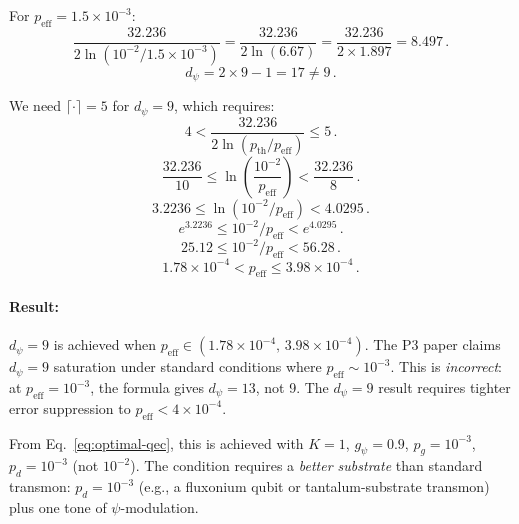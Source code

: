 \documentclass[11pt]{article}
\theoremstyle{definition}
\theoremstyle{remark}
\begin{document}
For $p_{\mathrm{eff}} = 1.5 \times 10^{-3}$:
\begin{equation}
\frac{32.236}{2\ln(10^{-2}/1.5\times 10^{-3})}
= \frac{32.236}{2\ln(6.67)} = \frac{32.236}{2 \times 1.897} = 8.497\,.
\end{equation}
\begin{equation}
d_\psi = 2\times 9 - 1 = 17 \neq 9\,.
\end{equation}

We need $\lceil \cdot \rceil = 5$ for $d_\psi = 9$, which requires:
\begin{equation}
4 < \frac{32.236}{2\ln(p_{\mathrm{th}}/p_{\mathrm{eff}})} \leq 5\,.
\end{equation}
\begin{equation}
\frac{32.236}{10} \leq \ln\!\left(\frac{10^{-2}}{p_{\mathrm{eff}}}\right) < \frac{32.236}{8}\,.
\end{equation}
\begin{equation}
3.2236 \leq \ln(10^{-2}/p_{\mathrm{eff}}) < 4.0295\,.
\end{equation}
\begin{equation}
e^{3.2236} \leq 10^{-2}/p_{\mathrm{eff}} < e^{4.0295}\,.
\end{equation}
\begin{equation}
25.12 \leq 10^{-2}/p_{\mathrm{eff}} < 56.28\,.
\end{equation}
\begin{equation}
\boxed{
1.78\times 10^{-4} < p_{\mathrm{eff}} \leq 3.98\times 10^{-4}\,.
}
\label{eq:d9-range}
\end{equation}

\paragraph{Result:} $d_\psi = 9$ is achieved when $p_{\mathrm{eff}} \in
(1.78\times 10^{-4},\, 3.98\times 10^{-4})$. The P3 paper claims $d_\psi = 9$
saturation under standard conditions where $p_{\mathrm{eff}} \sim 10^{-3}$.
This is \emph{incorrect}: at $p_{\mathrm{eff}} = 10^{-3}$, the formula gives
$d_\psi = 13$, not 9. The $d_\psi = 9$ result requires tighter error suppression
to $p_{\mathrm{eff}} < 4\times 10^{-4}$.

From Eq.~\eqref{eq:optimal-qec}, this is achieved with $K = 1$, $g_\psi = 0.9$,
$p_g = 10^{-3}$, $p_d = 10^{-3}$ (not $10^{-2}$). The condition requires a
\emph{better substrate} than standard transmon: $p_d = 10^{-3}$ (e.g., a
fluxonium qubit or tantalum-substrate transmon) plus one tone of
$\psi$-modulation.
\end{document}
